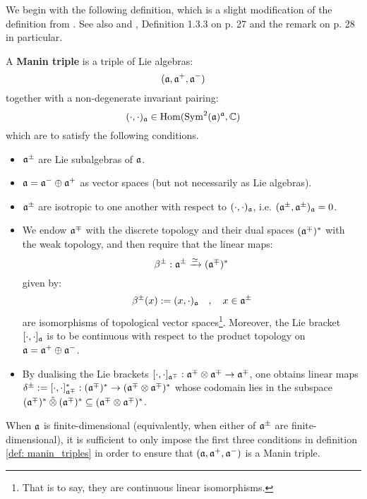We begin with the following definition, which is a slight modification of the definition from \cite[Subsection 2.6]{appel_laredo_2_categorical_etingof_kazhdan_quantisation}. See also \cite[Subsection 7.4]{etingof_kazhdan_quantisation_1} and \cite[Subsection 1.3.B]{chari_pressley_quantum_groups}, Definition 1.3.3 on p. 27 and the remark on p. 28 in particular.
\begin{definition} \label{def: manin_triples}
    A \textbf{Manin triple} is a triple of Lie algebras:
        $$(\mathfrak{a}, \mathfrak{a}^+, \mathfrak{a}^-)$$
    together with a non-degenerate invariant pairing:
        $$(\cdot, \cdot)_{\mathfrak{a}} \in \operatorname{Hom}( \operatorname{Sym}^2(\mathfrak{a})^{\mathfrak{a}}, \mathbb{C} )$$
    which are to satisfy the following conditions.
    \begin{itemize}
        \item $\mathfrak{a}^{\pm}$ are Lie subalgebras of $\mathfrak{a}$.
        \item $\mathfrak{a} = \mathfrak{a}^- \oplus \mathfrak{a}^+$ as vector spaces (but not necessarily as Lie algebras).
        \item $\mathfrak{a}^{\pm}$ are isotropic to one another with respect to $(\cdot, \cdot)_{\mathfrak{a}}$, i.e. $(\mathfrak{a}^{\pm}, \mathfrak{a}^{\pm})_{\mathfrak{a}} = 0$.
        \item We endow $\mathfrak{a}^{\mp}$ with the discrete topology and their dual spaces $(\mathfrak{a}^{\mp})^*$ with the weak topology, and then require that the linear maps:
            \begin{equation} \label{equation: manin_triple_currying}
                \beta^{\pm}: \mathfrak{a}^{\pm} \xrightarrow[]{\simeq} (\mathfrak{a}^{\mp})^*
            \end{equation}
        given by:
            $$\beta^{\pm}(x) := (x, \cdot)_{\mathfrak{a}} \quad, \quad x \in \mathfrak{a}^{\pm}$$
        are isomorphisms of topological vector spaces\footnote{That is to say, they are continuous linear isomorphisms.}. Moreover, the Lie bracket $[\cdot, \cdot]_{\mathfrak{a}}$ is to be continuous with respect to the product topology on $\mathfrak{a} = \mathfrak{a}^+ \oplus \mathfrak{a}^-$.
        \item By dualising the Lie brackets $[\cdot, \cdot]_{\a^{\mp}}: \a^{\mp} \tensor \a^{\mp} \to \a^{\mp}$, one obtains linear maps $\delta^{\pm} := [\cdot, \cdot]_{\a^{\mp}}^*: (\a^{\mp})^* \to (\a^{\mp} \tensor \a^{\mp})^*$ whose codomain lies in the subspace $(\a^{\mp})^* \hattensor (\a^{\mp})^* \subseteq (\a^{\mp} \tensor \a^{\mp})^*$.
    \end{itemize}
\end{definition}
\begin{remark}
    When $\mathfrak{a}$ is finite-dimensional (equivalently, when either of $\mathfrak{a}^{\pm}$ are finite-dimensional), it is sufficient to only impose the first three conditions in definition \ref{def: manin_triples} in order to ensure that $(\mathfrak{a}, \mathfrak{a}^+, \mathfrak{a}^-)$ is a Manin triple.
\end{remark}

